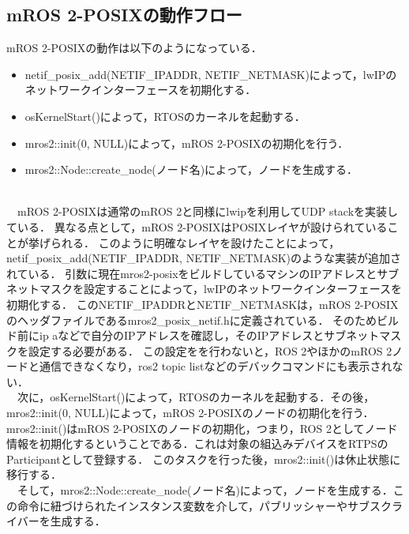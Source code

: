 \subsection{mROS 2-POSIXの動作フロー}
mROS 2-POSIXの動作は以下のようになっている．
\begin{itemize}
    \item netif\_posix\_add(NETIF\_IPADDR, NETIF\_NETMASK)によって，lwIPのネットワークインターフェースを初期化する．
    \item osKernelStart()によって，RTOSのカーネルを起動する．
    \item mros2::init(0, NULL)によって，mROS 2-POSIXの初期化を行う．
    \item mros2::Node::create_node(ノード名)によって，ノードを生成する．
\end{itemize}
\\　mROS 2-POSIXは通常のmROS 2と同様にlwipを利用してUDP stackを実装している．
異なる点として，mROS 2-POSIXはPOSIXレイヤが設けられていることが挙げられる．
このように明確なレイヤを設けたことによって，netif\_posix\_add(NETIF\_IPADDR, NETIF\_NETMASK)のような実装が追加されている．
引数に現在mros2-posixをビルドしているマシンのIPアドレスとサブネットマスクを設定することによって，lwIPのネットワークインターフェースを初期化する．
このNETIF\_IPADDRとNETIF\_NETMASKは，mROS 2-POSIXのヘッダファイルであるmros2\_posix\_netif.hに定義されている．
そのためビルド前にip aなどで自分のIPアドレスを確認し，そのIPアドレスとサブネットマスクを設定する必要がある．
この設定をを行わないと，ROS 2やほかのmROS 2ノードと通信できなくなり，ros2 topic listなどのデバックコマンドにも表示されない．
\\　次に，osKernelStart()によって，RTOSのカーネルを起動する．その後，mros2::init(0, NULL)によって，mROS 2-POSIXのノードの初期化を行う．
mros2::init()はmROS 2-POSIXのノードの初期化，つまり，ROS 2としてノード情報を初期化するということである．これは対象の組込みデバイスをRTPSのParticipantとして登録する．
このタスクを行った後，mros2::init()は休止状態に移行する．
\\　そして，mros2::Node::create\_node(ノード名)によって，ノードを生成する．この命令に紐づけられたインスタンス変数を介して，パブリッシャーやサブスクライバーを生成する．

